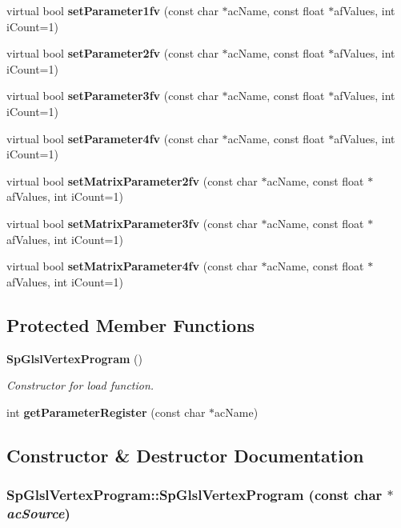\begin{CompactItemize}
\item 
virtual bool {\bf set\-Parameter1fv} (const char $\ast$ac\-Name, const float $\ast$af\-Values, int i\-Count=1)
\item 
virtual bool {\bf set\-Parameter2fv} (const char $\ast$ac\-Name, const float $\ast$af\-Values, int i\-Count=1)
\item 
virtual bool {\bf set\-Parameter3fv} (const char $\ast$ac\-Name, const float $\ast$af\-Values, int i\-Count=1)
\item 
virtual bool {\bf set\-Parameter4fv} (const char $\ast$ac\-Name, const float $\ast$af\-Values, int i\-Count=1)
\item 
virtual bool {\bf set\-Matrix\-Parameter2fv} (const char $\ast$ac\-Name, const float $\ast$af\-Values, int i\-Count=1)
\item 
virtual bool {\bf set\-Matrix\-Parameter3fv} (const char $\ast$ac\-Name, const float $\ast$af\-Values, int i\-Count=1)
\item 
virtual bool {\bf set\-Matrix\-Parameter4fv} (const char $\ast$ac\-Name, const float $\ast$af\-Values, int i\-Count=1)
\end{CompactItemize}
\subsection*{Protected Member Functions}
\begin{CompactItemize}
\item 
{\bf Sp\-Glsl\-Vertex\-Program} ()
\begin{CompactList}\small\item\em Constructor for load function. \item\end{CompactList}\item 
int {\bf get\-Parameter\-Register} (const char $\ast$ac\-Name)
\end{CompactItemize}


\subsection{Constructor \& Destructor Documentation}
\subsubsection{\setlength{\rightskip}{0pt plus 5cm}Sp\-Glsl\-Vertex\-Program::Sp\-Glsl\-Vertex\-Program (const char $\ast$ {\em ac\-Source})}\label{classSpark_1_1SpGlslVertexProgram_a0}


